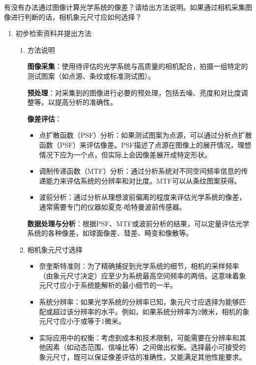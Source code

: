 \documentclass[dvipsnames, svgnames,a4paper,11pt]{article}
\begin{document}
	\begin{question}
		有没有办法通过图像计算光学系统的像差？请给出方法说明。如果通过相机采集图像进行判断的话，相机象元尺寸应如何选择？
	\end{question}
	\begin{enumerate}
		\item 初步检索资料并提出方法
		\begin{enumerate}
			\item 方法说明
			
			\textbf{图像采集}：使用待评估的光学系统与高质量的相机配合，拍摄一组特定的测试图案（如点源、条纹或标准测试图）。
			
			\textbf{预处理}：对采集到的图像进行必要的预处理，包括去噪、亮度和对比度调整等，以提高分析的准确性。
			
			\textbf{像差评估}：
			\begin{itemize}
				\item 点扩散函数（PSF）分析：如果测试图案为点源，可以通过分析点扩散函数（PSF）来评估像差。PSF描述了点源在图像上的展开情况，理想情况下应为一个点，但实际上会因像差展开成特定形状。
				\item 调制传递函数（MTF）分析：通过分析系统对不同空间频率信息的传递能力来评估系统的分辨率和对比度。MTF可以从条纹图案获得。
				\item 波前分析：通过分析从理想波前偏离的程度来评估光学系统的像差，通常需要专门的仪器如夏克-哈特曼波前传感器。
			\end{itemize}
			
			\textbf{数据处理与分析}：根据PSF、MTF或波前分析的结果，可以定量评估光学系统的各种像差，如球面像差、彗差、畸变和像散等。
			
			\item 相机象元尺寸选择
			\begin{itemize}
				\item 奈奎斯特准则：为了精确捕捉到光学系统的细节，相机的采样频率（由象元尺寸决定）应至少为系统最高空间频率的两倍。这意味着象元尺寸应小于系统能解析的最小细节的一半。
				\item 系统分辨率：如果光学系统的分辨率已知，象元尺寸应选择为能够匹配或超过该分辨率的水平。例如，如果系统分辨率为2微米，相机的象元尺寸应小于或等于1微米。
				\item 实际应用中的权衡：考虑到成本和技术限制，可能需要在分辨率和其他因素（如动态范围、信噪比等）之间做出权衡。选择最小可接受的象元尺寸，既可以保证像差评估的准确性，又能满足其他性能要求。
			\end{itemize}			
		\end{enumerate}
		

\end{enumerate}
\end{document}
